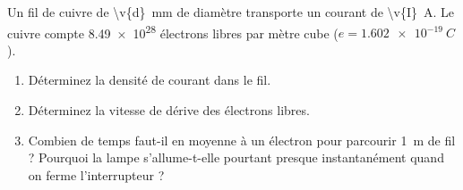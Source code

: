 Un fil de cuivre de \qty{\v{d}}{mm} de diamètre transporte un courant de \qty{\v{I}}{A}. Le cuivre compte \num{8.49e28} électrons libres par mètre cube ($e = \qty{1.602e-19}{C}$).

\begin{enumerate}[label=\alph*)]
    \item Déterminez la densité de courant dans le fil.
    \item Déterminez la vitesse de dérive des électrons libres.
    \item Combien de temps faut-il en moyenne à un électron pour parcourir \qty{1}{m} de fil ? Pourquoi la lampe s'allume-t-elle pourtant presque instantanément quand on ferme l'interrupteur ?
\end{enumerate}
